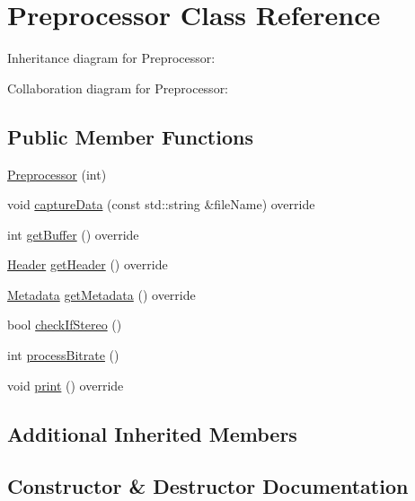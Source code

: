 \hypertarget{classPreprocessor}{}\section{Preprocessor Class Reference}
\label{classPreprocessor}


Inheritance diagram for Preprocessor\+:


Collaboration diagram for Preprocessor\+:
\subsection*{Public Member Functions}
\begin{DoxyCompactItemize}
\item 
\hyperlink{classPreprocessor_a9dcbd261afc0ae54359e586cca09541c}{Preprocessor} (int)
\item 
void \hyperlink{classPreprocessor_a0c44994af64474c46f442e9dcaabac05}{capture\+Data} (const std\+::string \&file\+Name) override
\item 
int \hyperlink{classPreprocessor_a6ec2e7b2c9341cf57db47de4cc7e9d84}{get\+Buffer} () override
\item 
\hyperlink{structHeader}{Header} \hyperlink{classPreprocessor_a4d5de3e54f8bf6a5b160665dff992337}{get\+Header} () override
\item 
\hyperlink{structMetadata}{Metadata} \hyperlink{classPreprocessor_aa5520c26dae59270ef25d303d369ce4c}{get\+Metadata} () override
\item 
bool \hyperlink{classPreprocessor_a5ddd30e7e8efc9d2ebdbfb355fb79c20}{check\+If\+Stereo} ()
\item 
int \hyperlink{classPreprocessor_ad996082402e7c64d6e81ba06719a7b77}{process\+Bitrate} ()
\item 
void \hyperlink{classPreprocessor_a7b4264680c47a71a0ae4f735501f3acf}{print} () override
\end{DoxyCompactItemize}
\subsection*{Additional Inherited Members}


\subsection{Constructor \& Destructor Documentation}
\mbox{\label{classPreprocessor_a9dcbd261afc0ae54359e586cca09541c}} 
